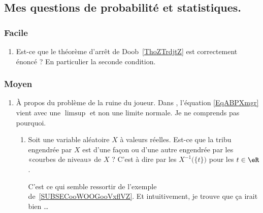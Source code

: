 \subsection{Mes questions de probabilité et statistiques.}

\subsubsection{Facile}

\begin{enumerate}
    \item
        Est-ce que le théorème d'arrêt de Doob~\ref{ThoZTrdjtZ} est correctement énoncé ? En particulier la seconde condition.
\end{enumerate}

\subsubsection{Moyen}

\begin{enumerate}
    \item
        À propos du problème de la ruine du joueur. Dans \cite{KXjFWKA}, l'équation \eqref{EqABPXmgr} vient avec une \( \limsup\) et non une limite normale. Je ne comprends pas pourquoi.
\begin{enumerate}
    \item
        Soit une variable aléatoire \( X\) à valeurs réelles. Est-ce que la tribu engendrée par \( X\) est d'une façon ou d'une autre engendrée par les «courbes de niveau» de \( X\) ? C'est à dire par les \( X^{-1}\big( \{ t \} \big)\) pour les \( t\in \eR\).

        C'est ce qui semble ressortir de l'exemple de~\ref{SUBSECooWOOGooVxflVZ}. Et intuitivement, je trouve que ça irait bien \ldots
\end{enumerate}

\end{enumerate}

